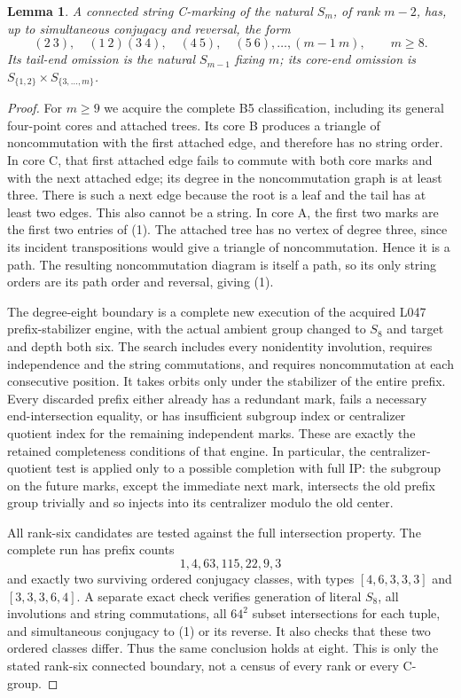 \documentclass[11pt,a4paper]{article}
\newtheorem{lemma}{Lemma}
\begin{document}
\begin{lemma}\label{core}
A connected string C-marking of the natural $S_m$, of rank
$m-2$, has, up to simultaneous conjugacy and reversal, the form
\[
 (2\ 3),\quad(1\ 2)(3\ 4),\quad(4\ 5),\quad
 (5\ 6),\ldots,(m-1\ m),\qquad m\ge8.                 \tag{1}
\]
Its tail-end omission is the natural $S_{m-1}$ fixing $m$;
its core-end omission is $S_{\{1,2\}}\times S_{\{3,\ldots,m\}}$.
\end{lemma}
\begin{proof}
For $m\ge9$ we acquire the complete B5 classification,
including its general four-point cores and attached trees.
Its core B produces a triangle of noncommutation with the
first attached edge, and therefore has no string order.
In core C, that first attached edge fails to commute with
both core marks and with the next attached edge; its degree
in the noncommutation graph is at least three. There is
such a next edge because the root is a leaf and the tail
has at least two edges. This also cannot be a string.
In core A, the first two marks are the first two entries
of (1). The attached tree has no vertex of degree three,
since its incident transpositions would give a triangle
of noncommutation. Hence it is a path. The resulting
noncommutation diagram is itself a path, so its only string
orders are its path order and reversal, giving (1).

The degree-eight boundary is a complete new execution of
the acquired L047 prefix-stabilizer engine, with the actual
ambient group changed to $S_8$ and target and depth both six.
The search includes every nonidentity involution, requires
independence and the string commutations, and requires
noncommutation at each consecutive position. It takes
orbits only under the stabilizer of the entire prefix.
Every discarded prefix either already has a redundant mark,
fails a necessary end-intersection equality, or has
insufficient subgroup index or centralizer quotient index
for the remaining independent marks. These are exactly
the retained completeness conditions of that engine.
In particular, the centralizer-quotient test is applied
only to a possible completion with full IP: the subgroup
on the future marks, except the immediate next mark,
intersects the old prefix group trivially and so injects
into its centralizer modulo the old center.

All rank-six candidates are tested against the full
intersection property. The complete run has prefix counts
\[
                      1,4,63,115,22,9,3
\]
and exactly two surviving ordered conjugacy classes,
with types $[4,6,3,3,3]$ and $[3,3,3,6,4]$.
A separate exact check verifies generation of literal $S_8$,
all involutions and string commutations, all $64^2$ subset
intersections for each tuple, and simultaneous conjugacy
to (1) or its reverse. It also checks that these two
ordered classes differ. Thus the same conclusion holds
at eight. This is only the stated rank-six connected
boundary, not a census of every rank or every C-group.


\end{proof}
\end{document}
